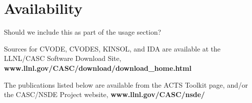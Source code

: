 \section{Availability}
\label{s:availability}

{\sf Should we include this as part of the usage section?}


Sources for CVODE, CVODES, KINSOL, and IDA are available at the
LLNL/CASC Software Download Site,
\newline \hspace*{.5in} {\bf www.llnl.gov/CASC/download/download\_home.html}

The publications listed below are available from the ACTS Toolkit page,
and/or the CASC/NSDE Project website,
\newline \hspace*{.5in} {\bf www.llnl.gov/CASC/nsde/}



